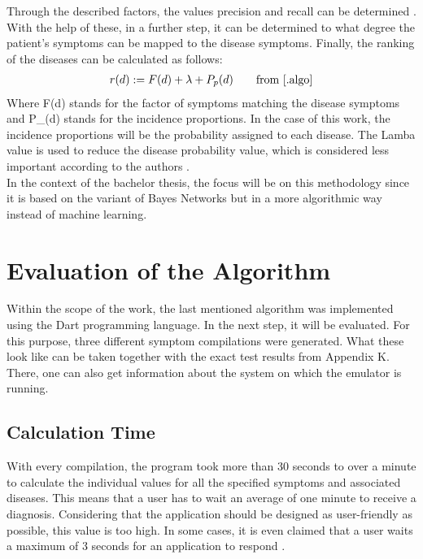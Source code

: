 \noindent
Through the described factors, the values precision and recall can be determined \cite[p. 9]{.algo}. With the help of these, in a further step, it can be determined to what degree the patient's symptoms can be mapped to the disease symptoms. Finally, the ranking of the diseases can be calculated as follows:
\begin{equation}
	\begin{aligned}
		r(d) := F(d) + \lambda + P_p(d)\\
	\end{aligned}\qquad\text{from \cite{.algo}}
\end{equation}
Where F(d) stands for the factor of symptoms matching the disease symptoms and P\_(d) stands for the incidence proportions. In the case of this work, the incidence proportions will be the probability assigned to each disease. The Lamba value is used to reduce the disease probability value, which is considered less important according to the authors \cite[p. 10]{.algo}. 
\newline \\
In the context of the bachelor thesis, the focus will be on this methodology since it is based on the variant of Bayes Networks but in a more algorithmic way instead of machine learning.


\section{Evaluation of the Algorithm}
Within the scope of the work, the last mentioned algorithm was implemented using the Dart programming language. In the next step, it will be evaluated. For this purpose, three different symptom compilations were generated. What these look like can be taken together with the exact test results from Appendix K. There, one can also get information about the system on which the emulator is running.

\subsection{Calculation Time}
With every compilation, the program took more than 30 seconds to over a minute to calculate the individual values for all the specified symptoms and associated diseases. This means that a user has to wait an average of one minute to receive a diagnosis. Considering that the application should be designed as user-friendly as possible, this value is too high. In some cases, it is even claimed that a user waits a maximum of 3 seconds for an application to respond \cite{.3sek}.

